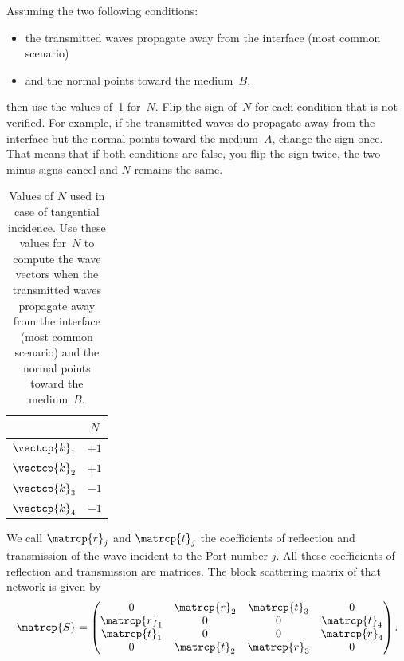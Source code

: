 \begin{refsection}
Assuming the two following conditions:
\begin{itemize}
    \item the transmitted waves propagate away from the interface (most common scenario)
    \item and the normal points toward the medium~$B$,
\end{itemize}
then use the values of~\cref{tab:fresnel_implementation_N} for~$N$.
Flip the sign of~$N$ for each condition that is not verified.
For example, if the transmitted waves do propagate away from the interface but the normal points toward the medium~$A$, change the sign once.
That means that if both conditions are false, you flip the sign twice, the two minus signs cancel and $N$ remains the same.

\begin{table}
    \centering
    \begin{tabular}{cc}
        \toprule
                       & $N$  \\
        \midrule
        $\vectcp{k}_1$ & $+1$ \\
        $\vectcp{k}_2$ & $+1$ \\
        $\vectcp{k}_3$ & $-1$ \\
        $\vectcp{k}_4$ & $-1$ \\
        \bottomrule
    \end{tabular}
    \caption{
        Values of $N$ used in case of tangential incidence.
        Use these values for~$N$ to compute the wave vectors when
        the transmitted waves propagate away from the interface (most common scenario)
        and the normal points toward the medium~$B$.
    }
    \label{tab:fresnel_implementation_N}
\end{table}

We call $\matrcp{r}_j$ and $\matrcp{t}_j$ the coefficients of reflection and transmission of the wave incident to the Port number $j$.
All these coefficients of reflection and transmission are matrices.
The block scattering matrix of that network is given by
\begin{equation}
    \matrcp{S} =
    \begin{pmatrix}
        0            & \matrcp{r}_2 & \matrcp{t}_3 & 0            \\
        \matrcp{r}_1 & 0            & 0            & \matrcp{t}_4 \\
        \matrcp{t}_1 & 0            & 0            & \matrcp{r}_4 \\
        0            & \matrcp{t}_2 & \matrcp{r}_3 & 0            \\
    \end{pmatrix}
    \text{.}
\end{equation}


\end{refsection}
